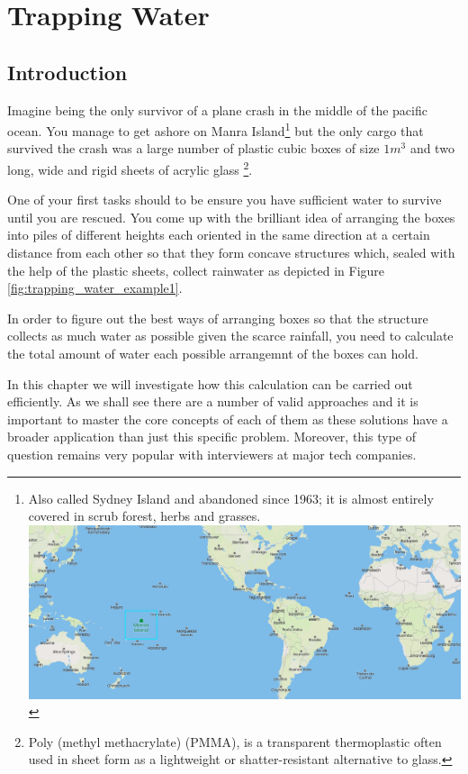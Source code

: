 %

\chapter{Trapping Water}
\label{ch:trapping_water}
\section*{Introduction}
Imagine being the only survivor of a plane crash in the middle of the pacific ocean. You manage to get ashore on Manra Island\footnote{Also called Sydney Island and abandoned since 1963;  it is almost entirely covered in scrub forest, herbs and grasses. 
\includegraphics[]{sources/trapping_water/images/manra_island}} 
but the only cargo that survived the crash was a large number of plastic cubic boxes of size $1m^3$ and two long, wide and rigid sheets of acrylic glass \footnote{Poly (methyl methacrylate) (PMMA), is a transparent thermoplastic often used in sheet form as a lightweight or shatter-resistant alternative to glass.}.

One of your first tasks should to be ensure you have sufficient water to survive until you are rescued. 
You come up with the brilliant idea of arranging the boxes into piles of different heights each oriented in the same direction  
at a certain distance from each other so that they form concave structures which,  sealed with the help of the plastic sheets,  collect rainwater as depicted in Figure \ref{fig:trapping_water_example1}. 

In order to figure out the best ways of arranging boxes so that the structure collects as much water as possible given the scarce rainfall, you need to calculate the total amount of water each possible arrangemnt of the boxes can hold.

In this chapter we will investigate how this calculation can be carried out efficiently. As we shall see there are a number of valid approaches  and it is important to master the core concepts of each of them as these solutions have a broader application than just this specific problem. Moreover, this type of question remains very popular with interviewers at major tech companies. 


